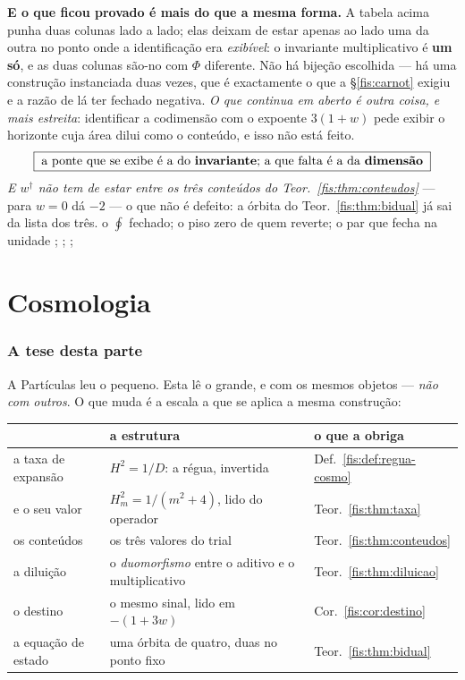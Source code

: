 \documentclass[livro.tex]{subfiles}
\begin{document}
\medskip\noindent\textbf{E o que ficou provado é mais do que a mesma forma.} A
tabela acima punha duas colunas lado a lado; elas deixam de estar apenas ao lado
uma da outra no ponto onde a identificação era \emph{exibível}: o invariante
multiplicativo é \textbf{um só}, e as duas colunas são-no com $\Phi$ diferente.
Não há bijeção escolhida --- há uma construção instanciada duas vezes, que é
exactamente o que a §\ref{fis:carnot} exigiu e a razão de lá ter fechado
negativa. \emph{O que continua em aberto é outra coisa, e mais estreita}:
identificar a codimensão com o expoente $3(1+w)$ pede exibir o horizonte cuja área
dilui como o conteúdo, e isso não está feito.
\[
\boxed{\;\text{a ponte que se exibe é a do \textbf{invariante};
a que falta é a da \textbf{dimensão}}\;}
\]
\emph{E $w^{\dagger}$ não tem de estar entre os três conteúdos do
Teor.~\ref{fis:thm:conteudos}} --- para $w=0$ dá $-2$ --- o que não é defeito: a
órbita do Teor.~\ref{fis:thm:bidual} já sai da lista dos três.
        {o $\oint$ fechado; o piso zero de quem reverte; o par que fecha na unidade}
        {; ; ; }
\part{Cosmologia}

\section*{A tese desta parte}\label{fis:cosmo-tese}

\noindent A Partículas leu o pequeno. Esta lê o grande, e com os mesmos
objetos --- \emph{não com outros}. O que muda é a escala a que se aplica a mesma
construção:
\begin{center}\small
\begin{tabular}{@{}lll@{}}
\toprule
& \textbf{a estrutura} & \textbf{o que a obriga} \\
\midrule
a taxa de expansão & $H^{2}=1/D$: a régua, invertida & Def.~\ref{fis:def:regua-cosmo} \\
e o seu valor & $H_m^{2}=1/(m^{2}+4)$, lido do operador & Teor.~\ref{fis:thm:taxa} \\
os conteúdos & os três valores do trial & Teor.~\ref{fis:thm:conteudos} \\
a diluição & o \emph{duomorfismo} entre o aditivo e o multiplicativo & Teor.~\ref{fis:thm:diluicao} \\
o destino & o mesmo sinal, lido em $-(1+3w)$ & Cor.~\ref{fis:cor:destino} \\
a equação de estado & uma órbita de quatro, duas no ponto fixo & Teor.~\ref{fis:thm:bidual} \\
\bottomrule
\end{tabular}
\end{center}
\end{document}
